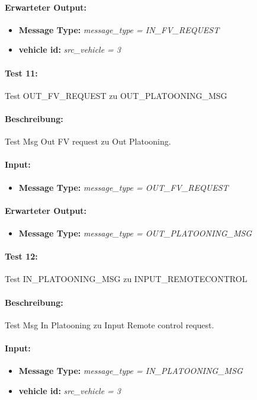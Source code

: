 \documentclass[a4paper, 12pt, titlepage]{scrartcl}
\begin{document}
{			\paragraph{Erwarteter Output:}
			\begin{itemize} \itemsep-0.5em
				\item \textbf{Message Type:} \emph{message\_type = IN\_FV\_REQUEST}
				\item \textbf{vehicle id:} \emph{src\_vehicle = 3}
			\end{itemize}

			\paragraph{Test 11:}{Test OUT\_FV\_REQUEST zu OUT\_PLATOONING\_MSG}
			\paragraph{Beschreibung:} Test Msg Out FV request zu Out Platooning.
			\paragraph{Input:}
			\begin{itemize} \itemsep-0.5em
				\item \textbf{Message Type:} \emph{message\_type = OUT\_FV\_REQUEST}
			\end{itemize}
			\paragraph{Erwarteter Output:}
			\begin{itemize} \itemsep-0.5em
				\item \textbf{Message Type:} \emph{message\_type = OUT\_PLATOONING\_MSG}
			\end{itemize}

			\paragraph{Test 12:}{Test IN\_PLATOONING\_MSG zu INPUT\_REMOTECONTROL}
			\paragraph{Beschreibung:} Test Msg In Platooning zu Input Remote control request.
			\paragraph{Input:}
			\begin{itemize} \itemsep-0.5em
				\item \textbf{Message Type:} \emph{message\_type = IN\_PLATOONING\_MSG}
				\item \textbf{vehicle id:} \emph{src\_vehicle = 3}
			\end{itemize}
}
\end{document}
